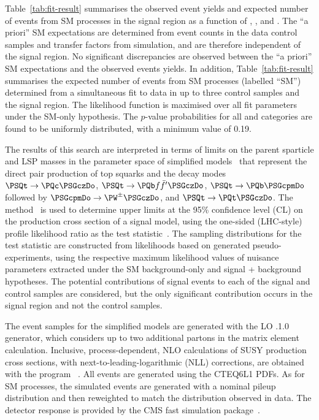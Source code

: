 Table~\ref{tab:fit-result} summarises the observed event yields and
expected number of events from SM processes in the signal region as a
function of \njet, \nb, and \scalht. The ``a priori'' SM expectations
are determined from event counts in the data control samples and
transfer factors from simulation, and are therefore independent of the
signal region. No significant discrepancies are observed between the
``a priori'' SM expectations and the observed events yields. In
addition, Table~\ref{tab:fit-result} summarises the expected number of
events from SM processes (labelled ``SM'') determined from a
simultaneous fit to data in up to three control samples and the signal
region. The likelihood function is maximised over all fit parameters
under the SM-only hypothesis. The $p$-value probabilities for all
\njet and \nb categories are found to be uniformly distributed, with a
minimum value of 0.19.

The results of this search are interpreted in terms of limits on the
parent sparticle and LSP masses in the parameter space of simplified
models~\cite{Alwall:2008ag, Alwall:2008va, sms} that represent the
direct pair production of top squarks and the decay modes $\PSQt
\to\PQc\PSGczDo$, $\PSQt \to{\PQb \ffbp} \PSGczDo$, $\PSQt \to \PQb
\PSGcpmDo$ followed by $\PSGcpmDo \to \PW^\pm \PSGczDo$, and $\PSQt
\to \PQt \PSGczDo$. The \cls method~\cite{read,junk} is used to
determine upper limits at the 95\% confidence level (CL) on the
production cross section of a signal model, using the one-sided
(LHC-style) profile likelihood ratio as the test
statistic~\cite{higgs-comb}. The sampling distributions for the test
statistic are constructed from likelihoods based on generated
pseudo-experiments, using the respective maximum likelihood values of
nuisance parameters extracted under the SM background-only and signal
+ background hypotheses. The potential contributions of signal events
to each of the signal and control samples are considered, but the only
significant contribution occurs in the signal region and not the
control samples.

The event samples for the simplified models are generated with the LO
.1.0 generator, which considers up to two additional
partons in the matrix element calculation. Inclusive,
process-dependent, NLO calculations of SUSY production cross sections,
with next-to-leading-logarithmic (NLL) corrections, are obtained with
the program ~\cite{Beenakker:1996ch, PhysRevD.80.095004,
  PhysRevLett.102.111802, PhysRevD.80.095004, 1126-6708-2009-12-041,
  doi:10.1142/S0217751X11053560, susy-nlo-nll}. All events are
generated using the \textsc{CTEQ6L1} PDFs. As for SM processes, the
simulated events are generated with a nominal pileup distribution and
then reweighted to match the distribution observed in data. The
detector response is provided by the CMS fast simulation
package~\cite{fastsim}.

